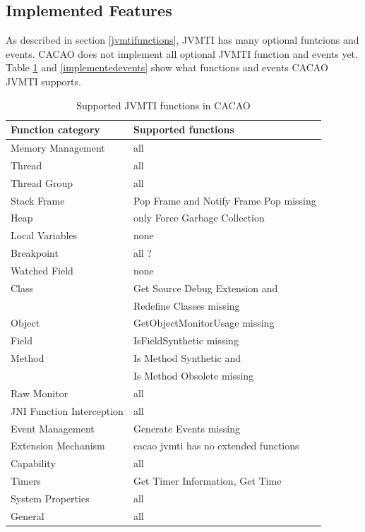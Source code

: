 \subsection{Implemented Features} %
As described in section \ref{jvmtifunctions}, JVMTI has many optional funtcions and events. CACAO does not implement all optional JVMTI function and events yet. Table \ref{implementedfunctions} and \ref{implementedevents} show what functions and events CACAO JVMTI supports.

\begin{table} [h]
\begin{center}
\begin{tabular}{|l|l|}
\hline
Function category & Supported functions\\\hline\hline
Memory Management& all \\\hline
Thread& all \\\hline
Thread Group& all \\\hline
Stack Frame& Pop Frame and Notify Frame Pop missing \\\hline
Heap& only Force Garbage Collection \\\hline
Local Variables& none \\\hline
Breakpoint& all ? \\\hline
Watched Field& none \\\hline
Class& Get Source Debug Extension and \\
        &  Redefine Classes missing \\\hline
Object& GetObjectMonitorUsage missing \\\hline
Field& IsFieldSynthetic missing \\\hline
Method& Is Method Synthetic and \\
           & Is Method Obsolete missing \\\hline
Raw Monitor& all \\\hline
JNI Function Interception& all \\\hline
Event Management& Generate Events missing \\\hline
Extension Mechanism& cacao jvmti has no extended functions \\\hline
Capability& all \\\hline
Timers& Get Timer Information, Get Time \\\hline
System Properties& all \\\hline
General& all \\\hline
 \end{tabular}\end{center}
\caption{Supported JVMTI functions in CACAO}
\label{implementedfunctions}
\end{table} 


